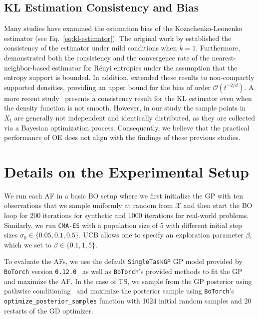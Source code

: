 \documentclass[accepted]{uai2025}
\begin{document}
\subsection{KL Estimation Consistency and Bias}
\label{ssec:proof-oe-bias}

Many studies have examined the estimation bias of the Kozachenko-Leonenko estimator (see Eq.~\eqref{eq:kl-estimator}). The original work by \citet{kozachenko1987statistical} established the consistency of the estimator under mild conditions when $k=1$. Furthermore, \citet{pal2010estimation} demonstrated both the consistency and the convergence rate of the nearest-neighbor-based estimator for R\'enyi entropies under the assumption that the entropy support is bounded. In addition, \citet{delattre2017kozachenko} extended these results to non-compactly supported densities, providing an upper bound for the bias of order $\mathcal{O}(t^{-2/d})$. A more recent study~\citep{devroye2021consistency} presents a consistency result for the KL estimator even when the density function is not smooth. However, in our study the sample points in $X_t$ are generally not independent and identically distributed, as they are collected via a Bayesian optimization process. Consequently, we believe that the practical performance of OE does not align with the findings of these previous studies.

\section{Details on the Experimental Setup}
\label{app:details-experiments}

We run each \ac{AF} in a basic \ac{BO} setup where we first initialize the \ac{GP} with ten observations that we sample uniformly at random from $\mathcal{X}$ and then start the \ac{BO} loop for 200 iterations for synthetic and 1000 iterations for real-world problems.
Similarly, we run \texttt{CMA-ES} with a population size of 5 with different initial step sizes $\sigma_0\in\{0.05, 0.1, 0.5\}$.
\ac{UCB} allows one to specify an exploration parameter $\beta$, which we set to $\beta\in\{0.1, 1, 5\}$.

To evaluate the \acp{AF}, we use the default \texttt{SingleTaskGP} \ac{GP} model provided by \texttt{BoTorch} version \texttt{0.12.0}~\citep{balandat2020botorch} as well as \texttt{BoTorch}'s provided methods to fit the \ac{GP} and maximize the \ac{AF}.
In the case of \ac{TS}, we sample from the \ac{GP} posterior using pathwise conditioning~\citep{wilson2021pathwise} and maximize the posterior sample using \texttt{BoTorch}'s \texttt{optimize\_posterior\_samples} function with 1024 initial random samples and 20 restarts of the \ac{GD} optimizer.
\end{document}
